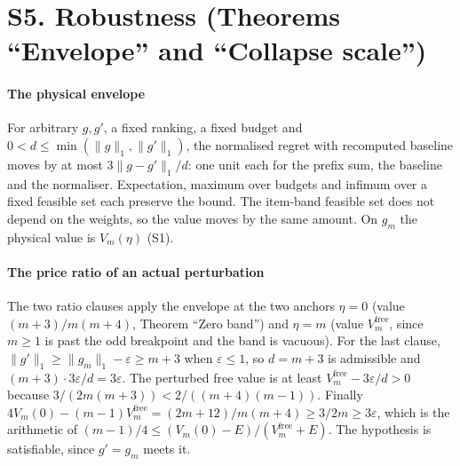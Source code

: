 
\section{S5. Robustness (Theorems ``Envelope'' and ``Collapse scale'')}

\paragraph{The physical envelope} For arbitrary $g,g'$, a fixed ranking, a fixed budget and
$0<d\le\min(\|g\|_{1},\|g'\|_{1})$, the normalised regret with recomputed baseline moves by
at most $3\|g-g'\|_{1}/d$: one unit each for the prefix sum, the baseline and the
normaliser. Expectation, maximum over budgets and infimum over a fixed feasible set each
preserve the bound. The item-band feasible set does not depend on the weights, so the value
moves by the same amount. On $g_{m}$ the physical value is $V_{m}(\eta)$ (S1).


\paragraph{The price ratio of an actual perturbation} The two ratio clauses apply the envelope
at the two anchors $\eta=0$ (value $(m+3)/m(m+4)$, Theorem ``Zero band'') and $\eta=m$ (value
$V^{\mathrm{free}}_{m}$, since $m\ge1$ is past the odd breakpoint and the band is vacuous).
For the last clause, $\|g'\|_{1}\ge\|g_{m}\|_{1}-\varepsilon\ge m+3$ when $\varepsilon\le1$, so $d=m+3$ is
admissible and $(m+3)\cdot3\varepsilon/d=3\varepsilon$. The perturbed free value is at least
$V^{\mathrm{free}}_{m}-3\varepsilon/d>0$ because
$3/(2m(m+3))<2/((m+4)(m-1))$. Finally
$4V_{m}(0)-(m-1)V^{\mathrm{free}}_{m}=(2m+12)/m(m+4)\ge3/2m\ge3\varepsilon$, which is the
arithmetic of $(m-1)/4\le(V_{m}(0)-E)/(V^{\mathrm{free}}_{m}+E)$. The hypothesis is
satisfiable, since $g'=g_{m}$ meets it.

